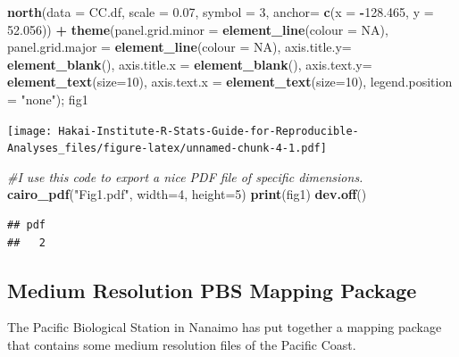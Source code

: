 \documentclass[]{book}
\newenvironment{Shaded}{\begin{snugshade}}{\end{snugshade}}
\newcommand{\KeywordTok}[1]{\textcolor[rgb]{0.13,0.29,0.53}{\textbf{#1}}}
\newcommand{\DataTypeTok}[1]{\textcolor[rgb]{0.13,0.29,0.53}{#1}}
\newcommand{\DecValTok}[1]{\textcolor[rgb]{0.00,0.00,0.81}{#1}}
\newcommand{\FloatTok}[1]{\textcolor[rgb]{0.00,0.00,0.81}{#1}}
\newcommand{\StringTok}[1]{\textcolor[rgb]{0.31,0.60,0.02}{#1}}
\newcommand{\CommentTok}[1]{\textcolor[rgb]{0.56,0.35,0.01}{\textit{#1}}}
\newcommand{\OtherTok}[1]{\textcolor[rgb]{0.56,0.35,0.01}{#1}}
\newcommand{\OperatorTok}[1]{\textcolor[rgb]{0.81,0.36,0.00}{\textbf{#1}}}
\newcommand{\NormalTok}[1]{#1}
\begin{document}
\begin{Shaded}
\begin{Highlighting}[]
\StringTok{  }\KeywordTok{north}\NormalTok{(}\DataTypeTok{data =}\NormalTok{ CC.df, }\DataTypeTok{scale =} \FloatTok{0.07}\NormalTok{, }\DataTypeTok{symbol =} \DecValTok{3}\NormalTok{, }\DataTypeTok{anchor=} \KeywordTok{c}\NormalTok{(}\DataTypeTok{x =} \OperatorTok{-}\FloatTok{128.465}\NormalTok{, }\DataTypeTok{y =} \FloatTok{52.056}\NormalTok{)) }\OperatorTok{+}
\StringTok{    }\KeywordTok{theme}\NormalTok{(}\DataTypeTok{panel.grid.minor =} \KeywordTok{element_line}\NormalTok{(}\DataTypeTok{colour =} \OtherTok{NA}\NormalTok{),}
          \DataTypeTok{panel.grid.major =} \KeywordTok{element_line}\NormalTok{(}\DataTypeTok{colour =} \OtherTok{NA}\NormalTok{),}
          \DataTypeTok{axis.title.y=} \KeywordTok{element_blank}\NormalTok{(), }\DataTypeTok{axis.title.x =} \KeywordTok{element_blank}\NormalTok{(),}
          \DataTypeTok{axis.text.y=} \KeywordTok{element_text}\NormalTok{(}\DataTypeTok{size=}\DecValTok{10}\NormalTok{), }\DataTypeTok{axis.text.x =} \KeywordTok{element_text}\NormalTok{(}\DataTypeTok{size=}\DecValTok{10}\NormalTok{),}
          \DataTypeTok{legend.position =} \StringTok{"none"}\NormalTok{); fig1}
\end{Highlighting}
\end{Shaded}

\texttt{[image: Hakai-Institute-R-Stats-Guide-for-Reproducible-Analyses\_files/figure-latex/unnamed-chunk-4-1.pdf]}

\begin{Shaded}
\begin{Highlighting}[]
\CommentTok{#I use this code to export a nice PDF file of specific dimensions.}
\KeywordTok{cairo_pdf}\NormalTok{(}\StringTok{"Fig1.pdf"}\NormalTok{, }\DataTypeTok{width=}\DecValTok{4}\NormalTok{, }\DataTypeTok{height=}\DecValTok{5}\NormalTok{)}
\KeywordTok{print}\NormalTok{(fig1)}
\KeywordTok{dev.off}\NormalTok{()}
\end{Highlighting}
\end{Shaded}

\begin{verbatim}
## pdf 
##   2
\end{verbatim}

\subsection{Medium Resolution PBS Mapping
Package}\label{medium-resolution-pbs-mapping-package}

The Pacific Biological Station in Nanaimo has put together a mapping
package that contains some medium resolution files of the Pacific Coast.
\end{document}
